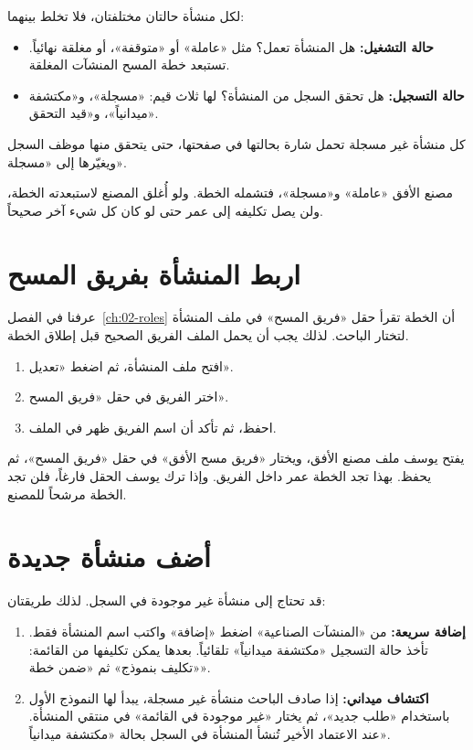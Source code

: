 لكل منشأة حالتان مختلفتان، فلا تخلط بينهما:

\begin{itemize}
\item \textbf{حالة التشغيل:} هل المنشأة تعمل؟ مثل «عاملة» أو «متوقفة»، أو مغلقة نهائياً. تستبعد خطة المسح المنشآت المغلقة.
\item \textbf{حالة التسجيل:} هل تحقق السجل من المنشأة؟ لها ثلاث قيم: «مسجلة»، و«مكتشفة ميدانياً»، و«قيد التحقق».
\end{itemize}

كل منشأة غير مسجلة تحمل شارة بحالتها في صفحتها، حتى يتحقق منها موظف السجل ويغيّرها إلى «مسجلة».

\begin{rcnote}
مصنع الأفق «عاملة» و«مسجلة»، فتشمله الخطة. ولو أُغلق المصنع لاستبعدته الخطة، ولن يصل تكليفه إلى عمر حتى لو كان كل شيء آخر صحيحاً.
\end{rcnote}

\section{اربط المنشأة بفريق المسح}
\label{sec:register-team}

عرفنا في الفصل~\ref{ch:02-roles} أن الخطة تقرأ حقل «فريق المسح» في ملف المنشأة لتختار الباحث. لذلك يجب أن يحمل الملف الفريق الصحيح قبل إطلاق الخطة.

\begin{enumerate}
\item افتح ملف المنشأة، ثم اضغط «تعديل».
\item اختر الفريق في حقل «فريق المسح».
\item احفظ، ثم تأكد أن اسم الفريق ظهر في الملف.
\end{enumerate}

\begin{rcnote}
يفتح يوسف ملف مصنع الأفق، ويختار «فريق مسح الأفق» في حقل «فريق المسح»، ثم يحفظ. بهذا تجد الخطة عمر داخل الفريق. وإذا ترك يوسف الحقل فارغاً، فلن تجد الخطة مرشحاً للمصنع.
\end{rcnote}

\section{أضف منشأة جديدة}
\label{sec:register-new}

قد تحتاج إلى منشأة غير موجودة في السجل. لذلك طريقتان:

\begin{enumerate}
\item \textbf{إضافة سريعة:} من «المنشآت الصناعية» اضغط «إضافة» واكتب اسم المنشأة فقط. تأخذ حالة التسجيل «مكتشفة ميدانياً» تلقائياً. بعدها يمكن تكليفها من القائمة: «تكليف بنموذج» ثم «ضمن خطة».
\item \textbf{اكتشاف ميداني:} إذا صادف الباحث منشأة غير مسجلة، يبدأ لها النموذج الأول باستخدام «طلب جديد»، ثم يختار «غير موجودة في القائمة» في منتقي المنشأة. عند الاعتماد الأخير تُنشأ المنشأة في السجل بحالة «مكتشفة ميدانياً».
\end{enumerate}

